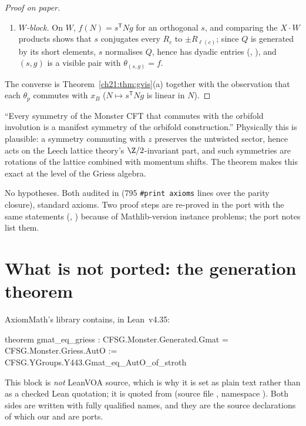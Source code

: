 \begin{proof}[Proof on paper]
\begin{enumerate}[label=(\alph*)]
  to sign, is rational with denominators dividing $8$, and preserves $\Leech$: $g\in\mathrm{Co}_0$
  (, ).
\item \emph{$W$-block.}  On $W$, $f(N)=s^{\mathsf T}Ng$ for an orthogonal $s$, and comparing the $X\cdot W$
  products shows that $s$ conjugates every $R_c$ to $\pm R_{\ell(c)}$; since $Q$ is generated by its short
  elements, $s$ normalises $Q$, hence has dyadic entries (,
  ), and $(s,g)$ is a visible pair with $\theta_{(s,g)}=f$.
\end{enumerate}
The converse is Theorem~\ref{ch21:thm:gvis}(a) together with the observation that each $\theta_p$
commutes with $x_B$ ($N\mapsto s^{\mathsf T}Ng$ is linear in $N$).
\end{proof}
\begin{physics}
``Every symmetry of the Monster CFT that commutes with the orbifold involution is a manifest
symmetry of the orbifold construction.''  Physically this is plausible: a symmetry commuting with $z$
preserves the untwisted sector, hence acts on the Leech lattice theory's $\Z/2$-invariant part, and
such symmetries are rotations of the lattice combined with momentum shifts.  The theorem makes this
exact at the level of the Griess algebra.
\end{physics}
\begin{status}
No hypotheses.  Both audited in  (795 \texttt{\#print axioms} lines over the
parity closure), standard axioms.  Two proof steps are re-proved in the port with the same statements
(, ) because of Mathlib-version instance problems; the
port notes list them.
\end{status}

\section{What is not ported: the generation theorem}\label{ch21:sec:notported}

AxiomMath's library contains, in Lean~v4.35:
\begin{plaincode}
theorem gmat_eq_griess :
    CFSG.Monster.Generated.Gmat = CFSG.Monster.Griess.AutO :=
  CFSG.YGroups.Y443.Gmat_eq_AutO_of_stroth
\end{plaincode}
This block is \emph{not} LeanVOA source, which is why it is set as plain text rather than as a
checked Lean quotation; it is quoted from  (source
file , namespace
).  Both sides are written with fully qualified names,
and they are the source declarations of which our  and  are ports.

